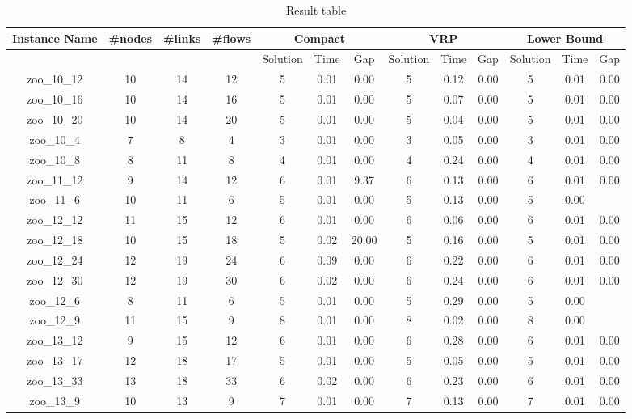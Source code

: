 \begin{landscape}
\begin{longtable}{|c|c|c|c|c|c|c|c|c|c|c|c|c|}
\caption{Result table}
\hline
Instance Name & \#nodes & \#links & \#flows & \multicolumn{3}{c|}{Compact} & \multicolumn{3}{c|}{VRP} & \multicolumn{3}{c|}{Lower Bound} \\ \hline
& & & & Solution & Time & Gap & Solution & Time & Gap & Solution & Time & Gap \\ \hline
zoo\_10\_12 & 10 & 14 & 12 & 5 & 0.01 & 0.00 & 5 & 0.12 & 0.00 & 5 & 0.01 & 0.00 \\ \hline 
zoo\_10\_16 & 10 & 14 & 16 & 5 & 0.01 & 0.00 & 5 & 0.07 & 0.00 & 5 & 0.01 & 0.00 \\ \hline 
zoo\_10\_20 & 10 & 14 & 20 & 5 & 0.01 & 0.00 & 5 & 0.04 & 0.00 & 5 & 0.01 & 0.00 \\ \hline 
zoo\_10\_4 & 7 & 8 & 4 & 3 & 0.01 & 0.00 & 3 & 0.05 & 0.00 & 3 & 0.01 & 0.00 \\ \hline 
zoo\_10\_8 & 8 & 11 & 8 & 4 & 0.01 & 0.00 & 4 & 0.24 & 0.00 & 4 & 0.01 & 0.00 \\ \hline 
zoo\_11\_12 & 9 & 14 & 12 & 6 & 0.01 & 9.37 & 6 & 0.13 & 0.00 & 6 & 0.01 & 0.00 \\ \hline 
zoo\_11\_6 & 10 & 11 & 6 & 5 & 0.01 & 0.00 & 5 & 0.13 & 0.00 & 5 & 0.00 &  \\ \hline 
zoo\_12\_12 & 11 & 15 & 12 & 6 & 0.01 & 0.00 & 6 & 0.06 & 0.00 & 6 & 0.01 & 0.00 \\ \hline 
zoo\_12\_18 & 10 & 15 & 18 & 5 & 0.02 & 20.00 & 5 & 0.16 & 0.00 & 5 & 0.01 & 0.00 \\ \hline 
zoo\_12\_24 & 12 & 19 & 24 & 6 & 0.09 & 0.00 & 6 & 0.22 & 0.00 & 6 & 0.01 & 0.00 \\ \hline 
zoo\_12\_30 & 12 & 19 & 30 & 6 & 0.02 & 0.00 & 6 & 0.24 & 0.00 & 6 & 0.01 & 0.00 \\ \hline 
zoo\_12\_6 & 8 & 11 & 6 & 5 & 0.01 & 0.00 & 5 & 0.29 & 0.00 & 5 & 0.00 &  \\ \hline 
zoo\_12\_9 & 11 & 15 & 9 & 8 & 0.01 & 0.00 & 8 & 0.02 & 0.00 & 8 & 0.00 &  \\ \hline 
zoo\_13\_12 & 9 & 15 & 12 & 6 & 0.01 & 0.00 & 6 & 0.28 & 0.00 & 6 & 0.01 & 0.00 \\ \hline 
zoo\_13\_17 & 12 & 18 & 17 & 5 & 0.01 & 0.00 & 5 & 0.05 & 0.00 & 5 & 0.01 & 0.00 \\ \hline 
zoo\_13\_33 & 13 & 18 & 33 & 6 & 0.02 & 0.00 & 6 & 0.23 & 0.00 & 6 & 0.01 & 0.00 \\ \hline 
zoo\_13\_9 & 10 & 13 & 9 & 7 & 0.01 & 0.00 & 7 & 0.13 & 0.00 & 7 & 0.01 & 0.00 \\ \hline 

\end{longtable}
\end{landscape}
